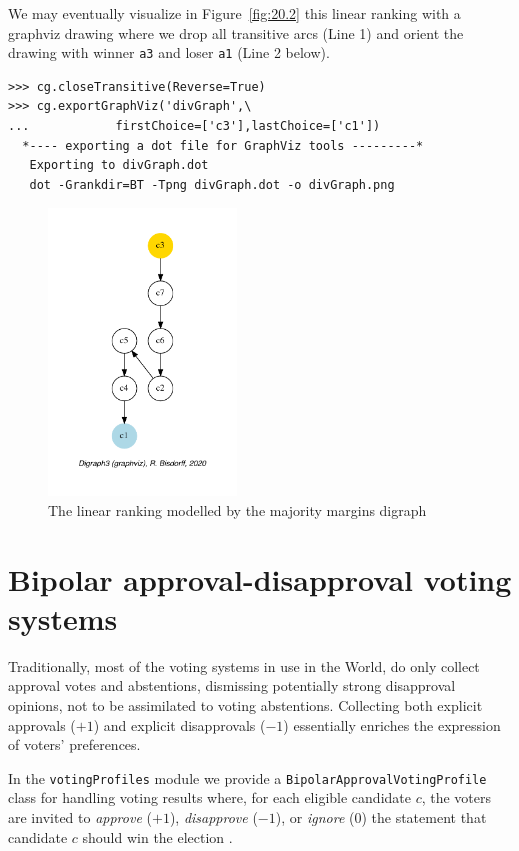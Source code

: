 We may eventually visualize in Figure~\vref{fig:20.2} this linear ranking with a graphviz drawing where we drop all transitive arcs (Line 1) and orient the drawing with \Condorcet winner \texttt{a3} and loser \texttt{a1} (Line 2 below).
\begin{lstlisting}
>>> cg.closeTransitive(Reverse=True)
>>> cg.exportGraphViz('divGraph',\
...            firstChoice=['c3'],lastChoice=['c1'])
  *---- exporting a dot file for GraphViz tools ---------*
   Exporting to divGraph.dot
   dot -Grankdir=BT -Tpng divGraph.dot -o divGraph.png
\end{lstlisting}
\begin{figure}[ht]
\sidecaption[t]
\includegraphics[width=5cm]{Figures/20-2-divGraph.pdf}
\caption{The linear ranking modelled by the majority margins digraph} 
\label{fig:20.2}       %
\end{figure}


\section{Bipolar approval-disapproval voting systems}
\label{sec:20.2}

Traditionally, most of the voting systems in use in the World, do only collect approval votes and abstentions, dismissing potentially strong disapproval opinions, not to be assimilated to voting abstentions. Collecting both explicit approvals ($+1$) and explicit disapprovals ($-1$) essentially enriches the expression of voters' preferences. 

In the \texttt{votingProfiles} module we provide a \texttt{BipolarApprovalVotingProfile} class for handling voting results where, for each eligible candidate $c$, the voters are invited  to \emph{approve} ($+1$), \emph{disapprove} ($-1$), or \emph{ignore} ($0$) the statement that candidate $c$ should win the election \citep{BAU-2012}.

